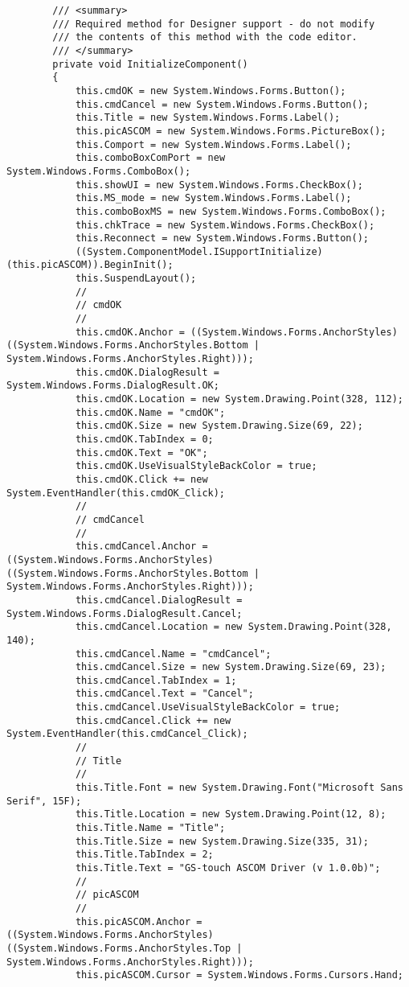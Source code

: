 \begin{lstlisting}
		/// <summary>
		/// Required method for Designer support - do not modify
		/// the contents of this method with the code editor.
		/// </summary>
		private void InitializeComponent()
		{
			this.cmdOK = new System.Windows.Forms.Button();
			this.cmdCancel = new System.Windows.Forms.Button();
			this.Title = new System.Windows.Forms.Label();
			this.picASCOM = new System.Windows.Forms.PictureBox();
			this.Comport = new System.Windows.Forms.Label();
			this.comboBoxComPort = new System.Windows.Forms.ComboBox();
			this.showUI = new System.Windows.Forms.CheckBox();
			this.MS_mode = new System.Windows.Forms.Label();
			this.comboBoxMS = new System.Windows.Forms.ComboBox();
			this.chkTrace = new System.Windows.Forms.CheckBox();
			this.Reconnect = new System.Windows.Forms.Button();
			((System.ComponentModel.ISupportInitialize)(this.picASCOM)).BeginInit();
			this.SuspendLayout();
			// 
			// cmdOK
			// 
			this.cmdOK.Anchor = ((System.Windows.Forms.AnchorStyles)((System.Windows.Forms.AnchorStyles.Bottom | System.Windows.Forms.AnchorStyles.Right)));
			this.cmdOK.DialogResult = System.Windows.Forms.DialogResult.OK;
			this.cmdOK.Location = new System.Drawing.Point(328, 112);
			this.cmdOK.Name = "cmdOK";
			this.cmdOK.Size = new System.Drawing.Size(69, 22);
			this.cmdOK.TabIndex = 0;
			this.cmdOK.Text = "OK";
			this.cmdOK.UseVisualStyleBackColor = true;
			this.cmdOK.Click += new System.EventHandler(this.cmdOK_Click);
			// 
			// cmdCancel
			// 
			this.cmdCancel.Anchor = ((System.Windows.Forms.AnchorStyles)((System.Windows.Forms.AnchorStyles.Bottom | System.Windows.Forms.AnchorStyles.Right)));
			this.cmdCancel.DialogResult = System.Windows.Forms.DialogResult.Cancel;
			this.cmdCancel.Location = new System.Drawing.Point(328, 140);
			this.cmdCancel.Name = "cmdCancel";
			this.cmdCancel.Size = new System.Drawing.Size(69, 23);
			this.cmdCancel.TabIndex = 1;
			this.cmdCancel.Text = "Cancel";
			this.cmdCancel.UseVisualStyleBackColor = true;
			this.cmdCancel.Click += new System.EventHandler(this.cmdCancel_Click);
			// 
			// Title
			// 
			this.Title.Font = new System.Drawing.Font("Microsoft Sans Serif", 15F);
			this.Title.Location = new System.Drawing.Point(12, 8);
			this.Title.Name = "Title";
			this.Title.Size = new System.Drawing.Size(335, 31);
			this.Title.TabIndex = 2;
			this.Title.Text = "GS-touch ASCOM Driver (v 1.0.0b)";
			// 
			// picASCOM
			// 
			this.picASCOM.Anchor = ((System.Windows.Forms.AnchorStyles)((System.Windows.Forms.AnchorStyles.Top | System.Windows.Forms.AnchorStyles.Right)));
			this.picASCOM.Cursor = System.Windows.Forms.Cursors.Hand;

\end{lstlisting}
